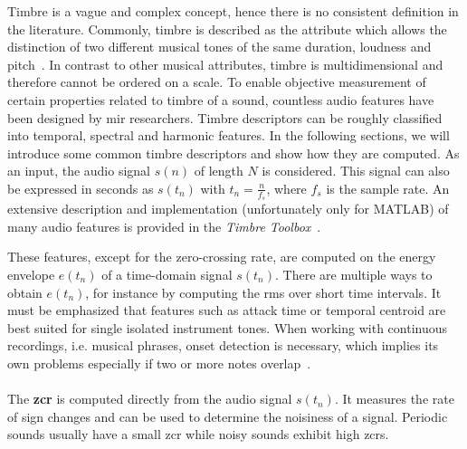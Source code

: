 Timbre is a vague and complex concept, hence there is no consistent definition in the literature. Commonly, timbre is described as the attribute which allows the distinction of two different musical tones of the same duration, loudness and pitch~\cite[p. 284]{moore2012introduction}. In contrast to other musical attributes, timbre is multidimensional and therefore cannot be ordered on a scale. To enable objective measurement of certain properties related to timbre of a sound, countless audio features have been designed by \gls{mir} researchers. Timbre descriptors can be roughly classified into temporal, spectral and harmonic features. In the following sections, we will introduce some common timbre descriptors and show how they are computed. As an input, the audio signal $s(n)$ of length $N$ is considered. This signal can also be expressed in seconds as $s(t_n)$ with $t_n = \frac{n}{f_s}$, where $f_s$ is the sample rate. An extensive description and implementation (unfortunately only for MATLAB) of many audio features is provided in the \textit{Timbre Toolbox}~\cite{peeters2011timbre}.

These features, except for the zero-crossing rate, are computed on the energy envelope $e(t_n)$ of a time-domain signal $s(t_n)$. There are multiple ways to obtain $e(t_n)$, for instance by computing the \gls{rms} over short time intervals. It must be emphasized that features such as attack time or temporal centroid are best suited for single isolated instrument tones. When working with continuous recordings, i.e. musical phrases, onset detection is necessary, which implies its own problems especially if two or more notes overlap~\cite{david2004efficient}.\\~\\

The \textbf{\gls{zcr}} is computed directly from the audio signal $s(t_n)$. It measures the rate of sign changes and can be used to determine the noisiness of a signal. Periodic sounds usually have a small \gls{zcr} while noisy sounds  exhibit high \glspl{zcr}.\\~\\

